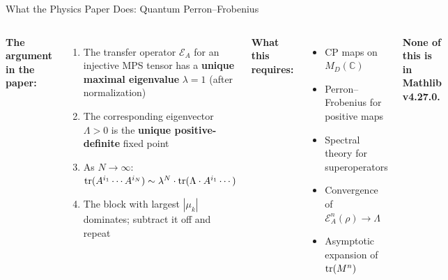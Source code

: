 \documentclass[aspectratio=169,10pt]{beamer}
\begin{document}
\begin{frame}{What the Physics Paper Does: Quantum Perron--Frobenius}
\vspace{-0.3em}
\begin{columns}[T]
{\small\textbf{The argument in the paper:}}
\begin{enumerate}\itemsep0.15em
  \item {\small The transfer operator $\mathcal{E}_A$ for an injective MPS tensor has a \textbf{unique maximal eigenvalue} $\lambda = 1$ (after normalization)}
  \item {\small The corresponding eigenvector $\Lambda > 0$ is the \textbf{unique positive-definite} fixed point}
  \item {\small As $N \to \infty$:
  $ \mathrm{tr}(A^{i_1} \cdots A^{i_N}) \sim \lambda^N \cdot \mathrm{tr}(\Lambda \cdot A^{i_1} \cdots)$}
  \item {\small The block with largest $|\mu_k|$ dominates; subtract it off and repeat}
\end{enumerate}

{\small\textbf{What this requires:}}
\begin{itemize}\itemsep0.1em
  \item[\textcolor{softred}{$\boldsymbol{\times}$}] {\small CP maps on $M_D(\mathbb{C})$}
  \item[\textcolor{softred}{$\boldsymbol{\times}$}] {\small Perron--Frobenius for positive maps}
  \item[\textcolor{softred}{$\boldsymbol{\times}$}] {\small Spectral theory for superoperators}
  \item[\textcolor{softred}{$\boldsymbol{\times}$}] {\small Convergence of $\mathcal{E}_A^n(\rho) \to \Lambda$}
  \item[\textcolor{softred}{$\boldsymbol{\times}$}] {\small Asymptotic expansion of $\mathrm{tr}(M^n)$}
\end{itemize}

\vspace{0.3em}
{\small \textcolor{softred}{\textbf{None of this is in Mathlib v4.27.0.}}}
\end{columns}

\vspace{0.3em}
\begin{center}
\end{center}
\end{frame}
\end{document}
